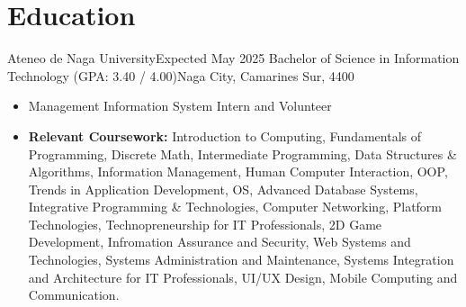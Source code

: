 \section{Education}

\resumeSubHeadingListStart
    \resumeSubheading
    {Ateneo de Naga University}{Expected May 2025}
    {Bachelor of Science in Information Technology (GPA: 3.40 / 4.00)}{Naga City, Camarines Sur, 4400}
    \begin{itemize}
        \item{Management Information System Intern and Volunteer}
    \end{itemize}
    \begin{itemize}
        \item \textbf{Relevant Coursework:} Introduction to Computing, Fundamentals of Programming, Discrete Math, Intermediate Programming, Data Structures \& Algorithms, Information Management, Human Computer Interaction, OOP, Trends in Application Development, OS, Advanced Database Systems, Integrative Programming \& Technologies, Computer Networking, Platform Technologies, Technopreneurship for IT Professionals, 2D Game Development, Infromation Assurance and Security, Web Systems and Technologies, Systems Administration and Maintenance, Systems Integration and Architecture for IT Professionals, UI/UX Design, Mobile Computing and Communication.
    \end{itemize}
\resumeSubHeadingListEnd
